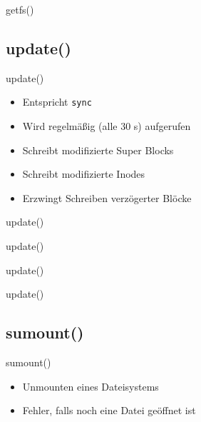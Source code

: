 \documentclass{beamer}
\begin{document}
\begin{frame}{getfs()}
\end{frame}




\subsection{update()}

\begin{frame}{update()}
    \begin{itemize}
        \item Entspricht \texttt{sync}
        \item Wird regelmäßig (alle 30 s) aufgerufen

        \bigskip

        \item Schreibt modifizierte Super Blocks
        \item Schreibt modifizierte Inodes
        \item Erzwingt Schreiben verzögerter Blöcke
    \end{itemize}
\end{frame}

\begin{frame}{update()}
\end{frame}

\begin{frame}{update()}
\end{frame}

\begin{frame}{update()}
\end{frame}

\begin{frame}{update()}
\end{frame}




\subsection{sumount()}

\begin{frame}{sumount()}
    \begin{itemize}
        \item Unmounten eines Dateisystems
        \medskip
        \item Fehler, falls noch eine Datei geöffnet ist
    \end{itemize}
\end{frame}
\end{document}
